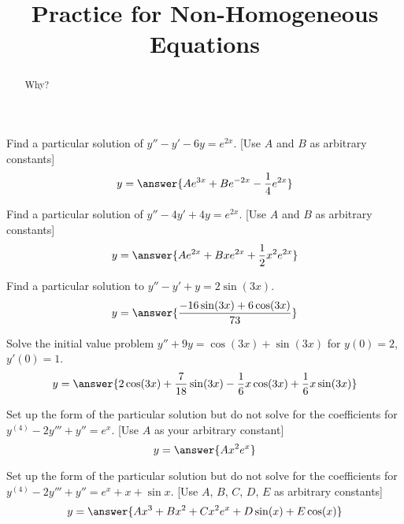 \documentclass{ximera}
\title{Practice for Non-Homogeneous Equations}
\begin{document}
\begin{abstract}
    Why?
\end{abstract}
\maketitle

 
\begin{exercise}
    Find a particular solution of $y''-y' -6y = e^{2x}$. [Use $A$ and $B$ as arbitrary constants]
    \[
        y = \answer{Ae^{3x} + Be^{-2x} - \frac{1}{4}e^{2x}}
    \]
\end{exercise}

\begin{exercise}
    Find a particular solution of $y''-4y' +4y = e^{2x}$. [Use $A$ and $B$ as arbitrary constants]
    \[
        y = \answer{Ae^{2x} + Bxe^{2x} + \frac{1}{2}x^2e^{2x}}
    \]
\end{exercise}

\begin{exercise}%
    Find a particular solution to $y''-y'+y=2\sin(3x)$.
    \[
        y = \answer{\frac{-16\sin(3x)+6\cos(3x)}{73}}
    \]
\end{exercise}

\begin{exercise}
    Solve the initial value problem $y''+9y = \cos (3x) + \sin (3x)$ for $y(0) = 2$, $y'(0) = 1$.
    \[
        y = \answer{2\cos(3x) + \frac{7}{18}\sin(3x) - \frac{1}{6}x\cos(3x) + \frac{1}{6}x\sin(3x)}
    \]
\end{exercise}

\begin{exercise}
    Set up the form of the particular solution but do not solve for the coefficients for $y^{(4)}-2y'''+y'' = e^x$. [Use $A$ as your arbitrary constant]
    \[
        y = \answer{Ax^2e^x}
    \]
\end{exercise}

\begin{exercise}
    Set up the form of the particular solution but do not solve for the coefficients for $y^{(4)}-2y'''+y'' = e^x + x + \sin x$. [Use $A$, $B$, $C$, $D$, $E$ as arbitrary constants]
    \[
        y = \answer{Ax^3 + Bx^2 + Cx^2e^x + D\sin(x) + E\cos(x)}
    \]
\end{exercise}
\end{document}
